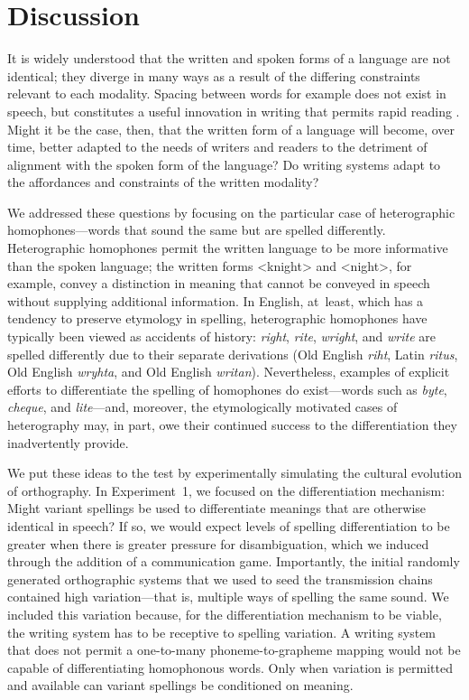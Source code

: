 \documentclass[doc,biblatex]{apa7}
\begin{document}

\section{Discussion}

It is widely understood that the written and spoken forms of a language are not identical; they diverge in many ways as a result of the differing constraints relevant to each modality. Spacing between words for example does not exist in speech, but constitutes a useful innovation in writing that permits rapid reading \parencite{Rastle:2019, RaynerFischer:1998, Sainio:2007, Zang:2013}. Might it be the case, then, that the written form of a language will become, over time, better adapted to the needs of writers and readers to the detriment of alignment with the spoken form of the language? Do writing systems adapt to the affordances and constraints of the written modality?

We addressed these questions by focusing on the particular case of heterographic homophones---words that sound the same but are spelled differently. Heterographic homophones permit the written language to be more informative than the spoken language; the written forms <knight> and <night>, for example, convey a distinction in meaning that cannot be conveyed in speech without supplying additional information. In English, at~least, which has a tendency to preserve etymology in spelling, heterographic homophones have typically been viewed as accidents of history: \textit{right}, \textit{rite}, \textit{wright}, and \textit{write} are spelled differently due to their separate derivations (Old English \textit{riht}, Latin \textit{ritus}, Old English \textit{wryhta}, and Old English \textit{writan}). Nevertheless, examples of explicit efforts to differentiate the spelling of homophones do exist---words such as \textit{byte}, \textit{cheque}, and \textit{lite}---and, moreover, the etymologically motivated cases of heterography may, in part, owe their continued success to the differentiation they inadvertently provide.

We put these ideas to the test by experimentally simulating the cultural evolution of orthography. In Experiment~1, we focused on the differentiation mechanism: Might variant spellings be used to differentiate meanings that are otherwise identical in speech? If so, we would expect levels of spelling differentiation to be greater when there is greater pressure for disambiguation, which we induced through the addition of a communication game. Importantly, the initial randomly generated orthographic systems that we used to seed the transmission chains contained high variation---that is, multiple ways of spelling the same sound. We included this variation because, for the differentiation mechanism to be viable, the writing system has to be receptive to spelling variation. A writing system that does not permit a one-to-many phoneme-to-grapheme mapping would not be capable of differentiating homophonous words. Only when variation is permitted and available can variant spellings be conditioned on meaning.
\end{document}
